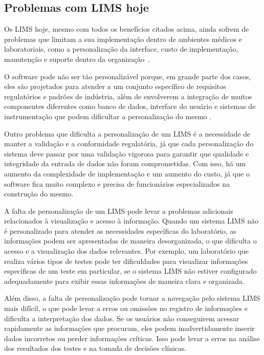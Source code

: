 \subsection{Problemas com LIMS hoje}


Os LIMS hoje, mesmo com todos os benefícios citados acima, ainda sofrem de problemas que limitam a sua implementação dentro de ambientes médicos e laboratoriais, como a personalização da interface, custo de implementação, manutenção e suporte dentro da organização~\cite{Avery2000ProductGuide., 2018CommonAstrix}.

O software pode não ser tão personalizável porque, em grande parte dos casos, eles são projetados para atender a um conjunto específico de requisitos regulatórios e padrões de indústria, além de envolverem a integração de muitos componentes diferentes como banco de dados, interface do usuário e sistemas de instrumentação que podem dificultar a personalização do mesmo \R.

Outro problema que dificulta a personalização de um LIMS é a necessidade de manter a validação e a conformidade regulatória, já que cada personalização do sistema deve passar por uma validação vigorosa para garantir que qualidade e integridade da entrada de dados não foram comprometidas.
Com isso, há um aumento da complexidade de implementação e um aumento do custo, já que o software fica muito complexo e precisa de funcionários especializados na construção do mesmo.



A falta de personalização de um LIMS pode levar a problemas adicionais relacionados à visualização e acesso à informação. Quando um sistema LIMS não é personalizado para atender as necessidades específicas do laboratório, as informações podem ser apresentadas de maneira desorganizada, o que dificulta o acesso e a visualização dos dados relevantes. Por exemplo, um laboratório que realiza vários tipos de testes pode ter dificuldades para visualizar informações específicas de um teste em particular, se o sistema LIMS não estiver configurado adequadamente para exibir essas informações de maneira clara e organizada.


Além disso, a falta de personalização pode tornar a navegação pelo sistema LIMS mais difícil, o que pode levar a erros ou omissões no registro de informações e dificulta a interpretação dos dados. Se os usuários não conseguirem acessar rapidamente as informações que procuram, eles podem inadvertidamente inserir dados incorretos ou perder informações críticas. Isso pode levar a erros na análise dos resultados dos testes e na tomada de decisões clínicas.

